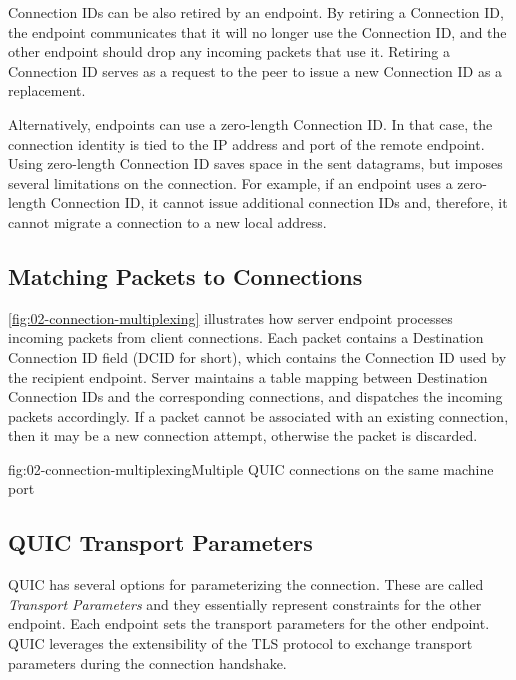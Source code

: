 Connection IDs can be also retired by an endpoint. By retiring a Connection ID, the endpoint
communicates that it will no longer use the Connection ID, and the other endpoint should drop any
incoming packets that use it. Retiring a Connection ID serves as a request to the peer to issue a
new Connection ID as a replacement.

Alternatively, endpoints can use a zero-length Connection ID. In that case, the connection identity
is tied to the IP address and port of the remote endpoint. Using zero-length Connection ID saves
space in the sent datagrams, but imposes several limitations on the connection. For example, if an
endpoint uses a zero-length Connection ID, it cannot issue additional connection IDs and, therefore,
it cannot migrate a connection to a new local address.

\subsection{Matching Packets to Connections}


\autoref{fig:02-connection-multiplexing} illustrates how server endpoint processes incoming packets
from client connections. Each packet contains a Destination Connection ID field (DCID for short),
which contains the Connection ID used by the recipient endpoint. Server maintains a table mapping
between Destination Connection IDs and the corresponding connections, and dispatches the incoming
packets accordingly. If a packet cannot be associated with an existing connection, then it may be a
new connection attempt, otherwise the packet is discarded.

\begin{myFigure}{fig:02-connection-multiplexing}{Multiple QUIC connections on the same machine port}




\end{myFigure}

\subsection{QUIC Transport Parameters}\label{sec:02-transport-parameters}

QUIC has several options for parameterizing the connection. These are called \textit{Transport
  Parameters} and they essentially represent constraints for the other endpoint. Each endpoint sets
the transport parameters for the other endpoint. QUIC leverages the extensibility of the TLS
protocol to exchange transport parameters during the connection handshake.

